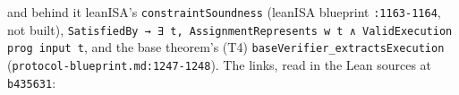 and behind it leanISA's \texttt{constraintSoundness} (leanISA blueprint \texttt{:1163-{}1164}, not built), \texttt{S\allowbreak{}a\allowbreak{}t\allowbreak{}i\allowbreak{}s\allowbreak{}f\allowbreak{}i\allowbreak{}e\allowbreak{}d\allowbreak{}B\allowbreak{}y\allowbreak{} →\allowbreak{} ∃\allowbreak{} t\allowbreak{},\allowbreak{} A\allowbreak{}s\allowbreak{}s\allowbreak{}i\allowbreak{}g\allowbreak{}n\allowbreak{}m\allowbreak{}e\allowbreak{}n\allowbreak{}t\allowbreak{}R\allowbreak{}e\allowbreak{}p\allowbreak{}r\allowbreak{}e\allowbreak{}s\allowbreak{}e\allowbreak{}n\allowbreak{}t\allowbreak{}s\allowbreak{} w\allowbreak{} t\allowbreak{} ∧\allowbreak{} V\allowbreak{}a\allowbreak{}l\allowbreak{}i\allowbreak{}d\allowbreak{}E\allowbreak{}x\allowbreak{}e\allowbreak{}c\allowbreak{}u\allowbreak{}t\allowbreak{}i\allowbreak{}o\allowbreak{}n\allowbreak{} p\allowbreak{}r\allowbreak{}o\allowbreak{}g\allowbreak{} i\allowbreak{}n\allowbreak{}p\allowbreak{}u\allowbreak{}t\allowbreak{} t}, and the base theorem's (T4) \texttt{b\allowbreak{}a\allowbreak{}s\allowbreak{}e\allowbreak{}V\allowbreak{}e\allowbreak{}r\allowbreak{}i\allowbreak{}f\allowbreak{}i\allowbreak{}e\allowbreak{}r\allowbreak{}\_\allowbreak{}e\allowbreak{}x\allowbreak{}t\allowbreak{}r\allowbreak{}a\allowbreak{}c\allowbreak{}t\allowbreak{}s\allowbreak{}E\allowbreak{}x\allowbreak{}e\allowbreak{}c\allowbreak{}u\allowbreak{}t\allowbreak{}i\allowbreak{}o\allowbreak{}n} (\texttt{p\allowbreak{}r\allowbreak{}o\allowbreak{}t\allowbreak{}o\allowbreak{}c\allowbreak{}o\allowbreak{}l\allowbreak{}-{}\allowbreak{}b\allowbreak{}l\allowbreak{}u\allowbreak{}e\allowbreak{}p\allowbreak{}r\allowbreak{}i\allowbreak{}n\allowbreak{}t\allowbreak{}.\allowbreak{}m\allowbreak{}d\allowbreak{}:\allowbreak{}1\allowbreak{}2\allowbreak{}4\allowbreak{}7\allowbreak{}-{}\allowbreak{}1\allowbreak{}2\allowbreak{}4\allowbreak{}8}). The links, read in the Lean sources at \texttt{b435631}:

